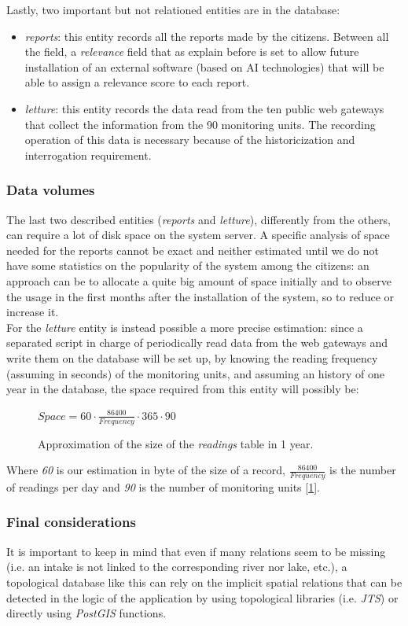 Lastly, two important but not relationed entities are in the database:
\begin{itemize}
    \item \textit{reports}: this entity records all the reports made by the citizens. Between all the field, a \textit{relevance} field that as explain before is set to allow future installation of an external software (based on AI technologies) that will be able to assign a relevance score to each report.
    \item \textit{letture}: this entity records the data read from the ten public web gateways that collect the information from the 90 monitoring units. The recording operation of this data is necessary because of the historicization and interrogation requirement.
\end{itemize}

\subsubsection{Data volumes}
The last two described entities (\textit{reports} and \textit{letture}), differently from the others, can require a lot of disk space on the system server.
A specific analysis of space needed for the reports cannot be exact and neither estimated until we do not have some statistics on the popularity of the system among the citizens: an approach can be to allocate a quite big amount of space initially and to observe the usage in the first months after the installation of the system, so to reduce or increase it. \\
For the \textit{letture} entity is instead possible a more precise estimation: since a separated script in charge of periodically read data from the web gateways and write them on the database will be set up, by knowing the reading frequency (assuming in seconds) of the monitoring units, and assuming an history of one year in the database, the space required from this entity will possibly be: \\
\begin{figure}[H]
    \centering
    \begin{math}
        Space = 60\cdot\frac{86400}{Frequency}\cdot365\cdot90
    \end{math}
    \caption{Approximation of the size of the \textit{readings} table in 1 year.}
    \label{letture_space}
\end{figure}
Where \textit{60} is our estimation in byte of the size of a record, \(\frac{86400}{Frequency}\) is the number of readings per day and \textit{90} is the number of monitoring units [\ref{letture_space}].
   
\subsubsection{Final considerations}
It is important to keep in mind that even if many relations seem to be missing (i.e. an intake is not linked to the corresponding river nor lake, etc.), a topological database like this can rely on the implicit spatial relations that can be detected in the logic of the application by using topological libraries (i.e. \textit{JTS}) or directly using \textit{PostGIS} functions.


